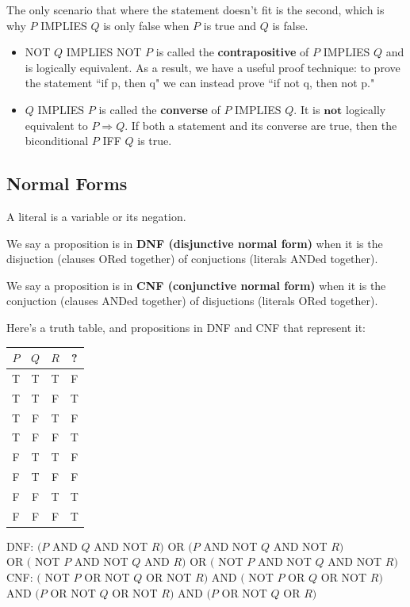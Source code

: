 \documentclass[12pt,letterpaper]{article}
\begin{document}
The only scenario that where the statement doesn't fit is the second, which is why $P$ IMPLIES $Q$ is only false when $P$ is true and $Q$ is false.

\begin{itemize}
    \item NOT $Q$ IMPLIES NOT $P$ is called the \textbf{contrapositive} of $P$ IMPLIES $Q$ and is logically equivalent. As a result, we have a useful proof technique: to prove the statement ``if p, then q" we can instead prove ``if not q, then not p."
    \item $Q$ IMPLIES $P$ is called the \textbf{converse} of $P$ IMPLIES $Q$. It is $\textbf{not}$ logically equivalent to $P \Rightarrow Q$. If both a statement and its converse are true, then the biconditional $P$ IFF $Q$ is true.
\end{itemize}

\subsection{Normal Forms}

A literal is a variable or its negation.

We say a proposition is in \textbf{DNF (disjunctive normal form)} when it is the disjuction (clauses ORed together) of conjuctions (literals ANDed together).
    
We say a proposition is in \textbf{CNF (conjunctive normal form)} when it is the conjuction (clauses ANDed together) of disjuctions (literals ORed together). 

Here's a truth table, and propositions in DNF and CNF that represent it:

\begin{tabular}{c|c|c|c}
     $P$ & $Q$ & $R$ & ?\\
    \hline
    T & T & T & F \\
    T & T & F & T \\
    T & F & T & F \\
    T & F & F & T \\
    F & T & T & F \\
    F & T & F & F \\
    F & F & T & T \\
    F & F & F & T
\end{tabular}

DNF: $(P$ AND $Q$ AND NOT $R)$ OR $(P$ AND NOT $Q$ AND NOT $R)$ \\
OR $($ NOT $P$ AND NOT $Q$ AND $R)$ OR $($ NOT $P$ AND NOT $Q$ AND NOT $R)$ \\
CNF: $($ NOT $P$ OR NOT $Q$ OR NOT $R)$ AND $($ NOT $P$ OR $Q$ OR NOT $R)$ \\
AND $(P$ OR NOT $Q$ OR NOT $R)$ AND $(P$ OR NOT $Q$ OR $R)$
\end{document}
